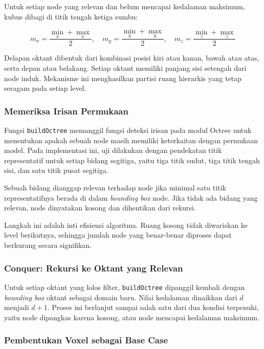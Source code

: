 \documentclass{article}
\begin{document}
Untuk setiap node yang relevan dan belum mencapai kedalaman maksimum, kubus dibagi di titik
tengah ketiga sumbu:

\[
m_x = \frac{\min_x + \max_x}{2}, \quad
m_y = \frac{\min_y + \max_y}{2}, \quad
m_z = \frac{\min_z + \max_z}{2}
\]

Delapan oktant dibentuk dari kombinasi posisi kiri atau kanan, bawah atau atas, serta depan
atau belakang. Setiap oktant memiliki panjang sisi setengah dari node induk. Mekanisme ini
menghasilkan partisi ruang hierarkis yang tetap seragam pada setiap level.

\subsubsection{Memeriksa Irisan Permukaan}

Fungsi \texttt{buildOctree} memanggil fungsi deteksi irisan pada modul Octree untuk menentukan
apakah sebuah node masih memiliki keterkaitan dengan permukaan model. Pada implementasi ini,
uji dilakukan dengan pendekatan titik representatif untuk setiap bidang segitiga, yaitu tiga
titik sudut, tiga titik tengah sisi, dan satu titik pusat segitiga.

Sebuah bidang dianggap relevan terhadap node jika minimal satu titik representatifnya berada
di dalam \textit{bounding box} node. Jika tidak ada bidang yang relevan, node dinyatakan kosong
dan dihentikan dari rekursi.

Langkah ini adalah inti efisiensi algoritma. Ruang kosong tidak diwariskan ke level berikutnya,
sehingga jumlah node yang benar-benar diproses dapat berkurang secara signifikan.

\subsubsection{Conquer: Rekursi ke Oktant yang Relevan}

Untuk setiap oktant yang lolos filter, \texttt{buildOctree} dipanggil kembali dengan
\textit{bounding box} oktant sebagai domain baru. Nilai kedalaman dinaikkan dari
$d$ menjadi $d + 1$. Proses ini berlanjut sampai salah satu dari dua kondisi terpenuhi,
yaitu node dipangkas karena kosong, atau node mencapai kedalaman maksimum.

\subsubsection{Pembentukan Voxel sebagai Base Case}
\end{document}
